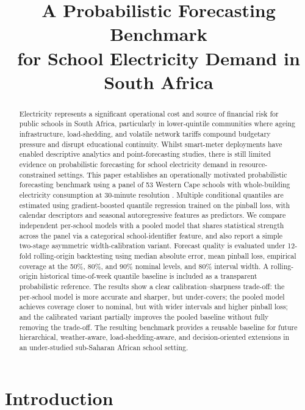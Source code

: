 \documentclass[12pt,a4paper]{article}
\title{\textbf{A Probabilistic Forecasting Benchmark\\for School Electricity Demand in South Africa}}
\author{}
\date{}
\begin{document}
\maketitle
\thispagestyle{empty}


\begin{abstract}
	Electricity represents a significant operational cost and source of financial risk for public schools in South Africa, particularly in lower-quintile communities where ageing infrastructure, load-shedding, and volatile network tariffs compound budgetary pressure and disrupt educational continuity. Whilst smart-meter deployments have enabled descriptive analytics and point-forecasting studies, there is still limited evidence on probabilistic forecasting for school electricity demand in resource-constrained settings. This paper establishes an operationally motivated probabilistic forecasting benchmark using a panel of 53 Western Cape schools with whole-building electricity consumption at 30-minute resolution \citep{samuels2025}. Multiple conditional quantiles are estimated using gradient-boosted quantile regression trained on the pinball loss, with calendar descriptors and seasonal autoregressive features as predictors. We compare independent per-school models with a pooled model that shares statistical strength across the panel via a categorical school-identifier feature, and also report a simple two-stage asymmetric width-calibration variant. Forecast quality is evaluated under 12-fold rolling-origin backtesting using median absolute error, mean pinball loss, empirical coverage at the 50\%, 80\%, and 90\% nominal levels, and 80\% interval width. A rolling-origin historical time-of-week quantile baseline is included as a transparent probabilistic reference. The results show a clear calibration--sharpness trade-off: the per-school model is more accurate and sharper, but under-covers; the pooled model achieves coverage closer to nominal, but with wider intervals and higher pinball loss; and the calibrated variant partially improves the pooled baseline without fully removing the trade-off. The resulting benchmark provides a reusable baseline for future hierarchical, weather-aware, load-shedding-aware, and decision-oriented extensions in an under-studied sub-Saharan African school setting.
\end{abstract}
\newpage


\section{Introduction}
\end{document}
